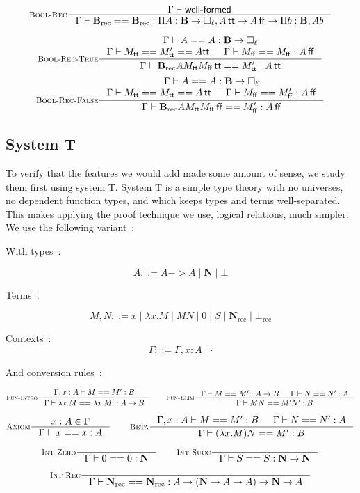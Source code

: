 \documentclass[11pt]{article}
\DeclareMathOperator{\rec}{rec}
\DeclareMathOperator{\true}{\mathsf{tt}}
\DeclareMathOperator{\false}{\mathsf{ff}}
\newcommand{\0}{\mathbf{0}}
\newcommand{\1}{\mathbf{1}}
\newcommand{\nat}{\mathbf{N}}
\newcommand{\bool}{\mathbf{B}}
\newcommand{\tctx}{\Gamma}
\newcommand{\Wf}{\textsf{well-formed}}
\begin{document}
$$
    \inference[\textsc{Bool-Rec}]{\tctx |- \Wf}{\tctx |- \bool_{\rec} == \bool_{\rec} : \Pi A : \bool \to \square_\ell, A \true \to A\false \to \Pi b :\bool, A b}
$$


$$
    \inference[\textsc{Bool-Rec-True}]{\tctx |- A == A : \bool -> \square_\ell \\ \tctx |- M_{\true} == M'_{\true} == A {\true} & \tctx |- M_{\false} == M_{\false} : A \false}{\tctx |- \bool_{\rec} A M_{\true} M_{\false} \true == M'_{\true} : A \true}
$$
$$
    \inference[\textsc{Bool-Rec-False}]{\tctx |- A == A : \bool -> \square_\ell \\ \tctx |- M_{\true} == M_{\true} == A \true & \tctx |- M_{\false} == M'_{\false} : A \false}{\tctx |- \bool_{\rec} A M_{\true} M_{\false} \false == M'_{\false} : A \false}
$$

\subsection{System T}
To verify that the features we would add made some amount of sense, we study them first using system T.
System T is a simple type theory with no universes, no dependent function types, and which keeps types and terms well-separated.
This makes applying the proof technique we use, logical relations, much simpler.
We use the following variant~:

With types~:

$$ A ::= A -> A \mid \nat \mid \bot $$

Terms~:

$$ M,N ::= x \mid \lambda x. M \mid MN \mid 0 \mid S \mid \nat_{\rec} \mid \bot_{\rec} $$


Contexts~:
$$ \tctx ::= \tctx, x : A \mid \cdot $$

And conversion rules~:


$$
    \inference[\textsc{Fun-Intro}]{\tctx, x : A |- M == M' : B }{\tctx |- \lambda x. M == \lambda x. M' : A -> B} \qquad
    \inference[\textsc{Fun-Elim}]{\tctx |- M == M' : A -> B& \tctx |- N == N' : A}{\tctx |- MN == M'N' : B}
$$

$$
    \inference[\textsc{Axiom}]{x : A \in \tctx }{\tctx |- x == x : A} \qquad
    \inference[\textsc{Beta}]{\tctx, x : A |- M == M' : B & \tctx |- N == N' : A}{\tctx |- (\lambda x. M)N == M' : B}
$$

$$
    \inference[\textsc{Int-Zero}]{}{\tctx |- 0 == 0 : \nat} \qquad
    \inference[\textsc{Int-Succ}]{}{\tctx |- S == S : \nat -> \nat}
$$

$$
    \inference[\textsc{Int-Rec}]{}{\tctx |- \nat_{\rec} == \nat_{\rec} : A \to \left(\nat -> A -> A \right) -> \nat -> A}
$$
\end{document}
